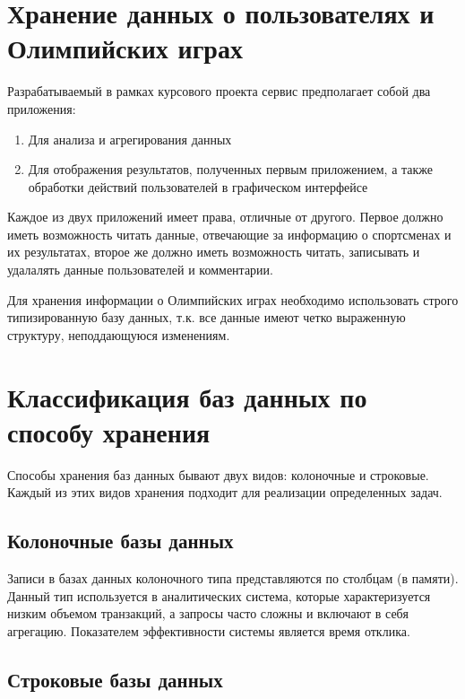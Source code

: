 \section{Хранение данных о пользователях и Олимпийских играх}

Разрабатываемый в рамках курсового проекта сервис предполагает собой два приложения:

\begin{enumerate} 
	\item Для анализа и агрегирования данных
	
	\item Для отображения результатов, полученных первым приложением, а также обработки действий пользователей в графическом интерфейсе
	
\end{enumerate}

Каждое из двух приложений имеет права, отличные от другого. 
Первое должно иметь возможность читать данные, отвечающие за информацию о спортсменах 
и их результатах, второе же должно иметь возможность читать, записывать и удалалять 
данные пользователей и комментарии.

\newpage

Для хранения информации о Олимпийских играх необходимо использовать строго типизированную 
базу данных, т.к. все данные имеют четко выраженную структуру, неподдающуюся изменениям.

\section{Классификация баз данных по способу хранения}

Способы хранения баз данных  бывают двух видов: колоночные и строковые. 
Каждый из этих видов хранения подходит для реализации определенных задач.


\subsection{Колоночные базы данных}

Записи в базах данных колоночного типа представляются по столбцам (в памяти). Данный тип используется в аналитических система, которые характеризуется низким объемом транзакций, а запросы часто сложны и включают в себя агрегацию. Показателем эффективности системы является время отклика.

\subsection{Строковые базы данных}

